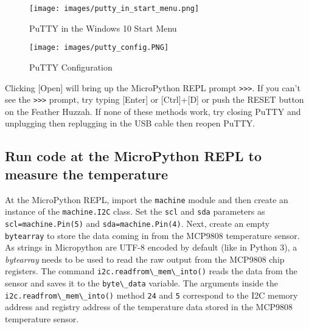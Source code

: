 \documentclass{book}
\makeatletter
\def\maxwidth{\ifdim\Gin@nat@width>\linewidth\linewidth
\else\Gin@nat@width\fi}
\let\Oldincludegraphics\includegraphics
\renewcommand{\includegraphics}[1]{\Oldincludegraphics[width=.8\maxwidth]{#1}}
\newcommand{\passthrough}[1]{#1}
\makeatother
\begin{document}
\begin{figure}
\centering
\texttt{[image: images/putty\_in\_start\_menu.png]}
\caption{PuTTY in the Windows 10 Start Menu}
\end{figure}

\begin{figure}
\centering
\texttt{[image: images/putty\_config.PNG]}
\caption{PuTTY Configuration}
\end{figure}

Clicking {[}Open{]} will bring up the MicroPython REPL prompt
\passthrough{\lstinline!>>>!}. If you can't see the
\passthrough{\lstinline!>>>!} prompt, try typing {[}Enter{]} or
{[}Ctrl{]}+{[}D{]} or push the RESET button on the Feather Huzzah. If
none of these methods work, try closing PuTTY and unplugging then
replugging in the USB cable then reopen PuTTY.
    




    
        \hypertarget{run-code-at-the-micropython-repl-to-measure-the-temperature}{%
\subsection{Run code at the MicroPython REPL to measure the
temperature}\label{run-code-at-the-micropython-repl-to-measure-the-temperature}}
    




    
        At the MicroPython REPL, import the \passthrough{\lstinline!machine!}
module and then create an instance of the
\passthrough{\lstinline!machine.I2C!} class. Set the
\passthrough{\lstinline!scl!} and \passthrough{\lstinline!sda!}
parameters as \passthrough{\lstinline!scl=machine.Pin(5)!} and
\passthrough{\lstinline!sda=machine.Pin(4)!}. Next, create an empty
\passthrough{\lstinline!bytearray!} to store the data coming in from the
MCP9808 temperature sensor. As strings in Micropython are UTF-8 encoded
by default (like in Python 3), a \emph{bytearray} needs to be used to
read the raw output from the MCP9808 chip registers. The command
\passthrough{\lstinline!i2c.readfrom\_mem\_into()!} reads the data from
the sensor and saves it to the \passthrough{\lstinline!byte\_data!}
variable. The arguments inside the
\passthrough{\lstinline!i2c.readfrom\_mem\_into()!} method
\passthrough{\lstinline!24!} and \passthrough{\lstinline!5!} correspond
to the I2C memory address and registry address of the temperature data
stored in the MCP9808 temperature sensor.
\end{document}
